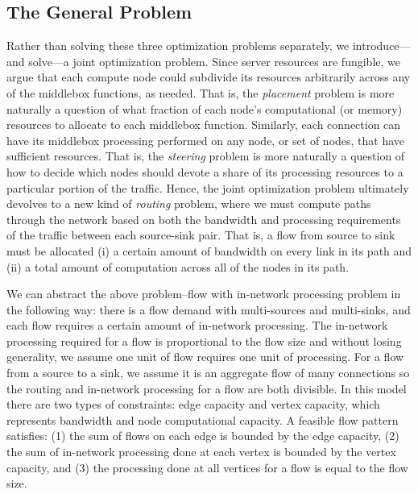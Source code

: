 \subsection{The General Problem}
Rather than solving these three optimization problems separately, we introduce---and solve---a joint optimization problem.  Since server resources are fungible, we argue that each compute node could subdivide its resources arbitrarily across any of the middlebox functions, as needed.  That is, the \emph{placement} problem is more naturally a question of what fraction of each node's computational (or memory) resources to allocate to each middlebox function.  Similarly, each connection can have its middlebox processing performed on any node, or set of nodes, that have sufficient resources.  That is, the \emph{steering} problem is more naturally a question of how to decide which nodes should devote a share of its processing resources to a particular portion of the traffic.  Hence, the joint optimization problem ultimately devolves to a new kind of \emph{routing} problem, where we must compute paths through the network based on both the bandwidth and processing requirements of the traffic between each source-sink pair.  That is, a flow from source to sink must be allocated (i) a certain amount of bandwidth on every link in its path and (ii) a total amount of computation across all of the nodes in its path.


We can abstract the above problem--flow with in-network processing problem in the following way: there is a flow demand with multi-sources and multi-sinks, and each flow requires a certain amount of in-network processing. The in-network processing required for a flow is proportional to the flow size and without losing generality, we assume one unit of flow requires one unit of processing. For a flow from a source to a sink, we assume it is an aggregate flow of many connections so the routing and in-network processing for a flow are both divisible. In this model there are two types of constraints: edge capacity and vertex capacity, which represents bandwidth and node computational capacity. A feasible flow pattern satisfies: (1) the sum of flows on each edge is bounded by the edge capacity, (2) the sum of in-network processing done at each vertex is bounded by the vertex capacity, and (3) the processing done at all vertices for a flow is equal to the flow size.

